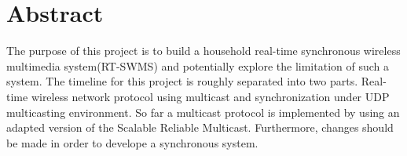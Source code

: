 \section*{Abstract}
The purpose of this project is to build a household real-time synchronous wireless multimedia system(RT-SWMS) and potentially explore the limitation of such a system. The timeline for this project is roughly separated into two parts. Real-time wireless network protocol using multicast and synchronization under UDP multicasting environment. So far a multicast protocol is implemented by using an adapted version of the Scalable Reliable Multicast. Furthermore, changes should be made in order to develope a synchronous system.